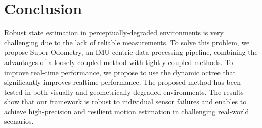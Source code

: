 \section{Conclusion}

Robust state estimation in perceptually-degraded environments is very challenging due to the lack of reliable measurements. To solve this problem, we propose Super Odometry,
an IMU-centric data processing pipeline, combining the
advantages of a loosely coupled method with tightly coupled
methods. To improve real-time performance, we propose
to use the dynamic octree that significantly improves realtime performance. The proposed method has been tested in
both visually and geometrically degraded environments. The
results show that our framework is robust to individual sensor
failures and enables to achieve high-precision and resilient
motion estimation in challenging real-world scenarios.